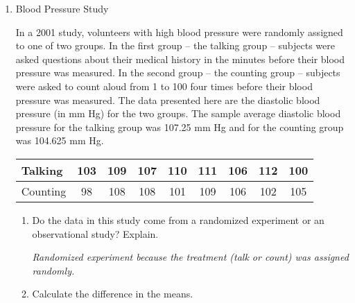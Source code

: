 \begin{enumerate}
\begin{enumerate}
\begin{key}
  {\it I rate death from a cancer which should have been detected as
    more critical than the anxiety of a false positive, so I think
    false negatives are more important.}
\end{key}

\end{enumerate}

\begin{students}
\newpage
\end{students}

\item Blood Pressure Study
 
In a 2001 study, volunteers with high blood pressure were randomly
assigned to one of two groups. In the first group -- the talking group
-- subjects were asked questions about their medical history in the
minutes before their blood pressure was measured.  In the second group
-- the counting group -- subjects were asked to count aloud from 1 to
100 four times before their blood pressure was measured.  The data
presented here are the diastolic blood pressure (in mm Hg) for the two
groups.  The sample average diastolic blood pressure for the talking
group was 107.25 mm Hg and for the counting group was 104.625 mm Hg. 
            
\begin{tabular}{|l|c|c|c|c|c|c|c|c|}\hline
 Talking & 103& 109& 107& 110& 111& 106& 112& 100\\ \hline
 Counting& 98& 108& 108& 101& 109& 106& 102& 105\\ \hline
\end{tabular}

\begin{enumerate}
     \item  Do the data in this study come from a randomized
       experiment or an observational study?  Explain. 
\begin{students}
  \vspace*{\fill}
\end{students} 

\begin{key}
  {\it Randomized experiment because the treatment (talk or count) was
    assigned randomly.}
\end{key}
     \item  Calculate the difference in the means. 
\begin{students}
  \vspace*{\fill}
\end{students} 


\end{enumerate}
\end{enumerate}
